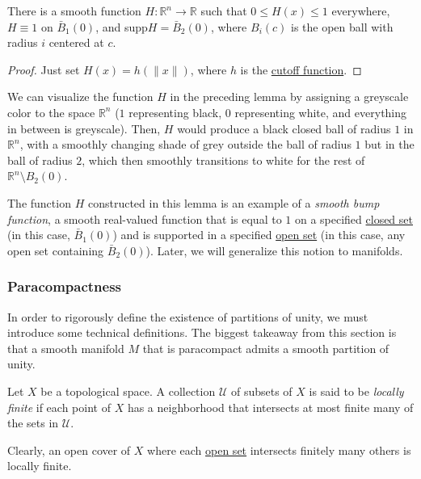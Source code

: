 \documentclass{article}
\newcounter{definition}[section]
\newcounter{example}[section]
\begin{document}
    \begin{lemma}
      \label{thm:smooth-bump-function-on-rn}
      There is a smooth function $H: \mathbb{R}^n \to \mathbb{R}$ such that $0 \leq H(x) \leq 1$ everywhere, $H \equiv 1$ on $\bar{B}_1 (0)$, and supp$H = \bar{B}_2 (0)$, where $B_i (c)$ is the open ball with radius $i$ centered at $c$. 
    \end{lemma}
    \begin{proof}
      Just set $H(x) = h(\|x\|)$,  where $h$ is the \hyperref[thm:cutoff-function]{cutoff function}. 
    \end{proof}

    We can visualize the function $H$ in the preceding lemma by assigning a greyscale color to the space $\mathbb{R}^n$ ($1$ representing black, $0$ representing white, and everything in between is greyscale). Then, $H$ would produce a black closed ball of radius $1$ in $\mathbb{R}^n$, with a smoothly changing shade of grey outside the ball of radius $1$ but in the ball of radius $2$, which then smoothly transitions to white for the rest of $\mathbb{R}^n \setminus B_2 (0)$. 

    The function $H$ constructed in this lemma is an example of a \textit{smooth bump function}, a smooth real-valued function that is equal to $1$ on a specified \hyperref[pst-def:closed]{closed set} (in this case, $\bar{B}_1 (0)$) and is supported in a specified \hyperref[pst-def:open-set]{open set} (in this case, any open set containing $\bar{B}_2 (0)$). Later, we will generalize this notion to manifolds. 

    \subsubsection{Paracompactness}

      In order to rigorously define the existence of partitions of unity, we must introduce some technical definitions. The biggest takeaway from this section is that a smooth manifold $M$ that is paracompact admits a smooth partition of unity. 

      \begin{definition}
        \label{def:locally-finite}
        Let $X$ be a topological space. A collection $\mathcal{U}$ of subsets of $X$ is said to be \textit{locally finite} if each point of $X$ has a neighborhood that intersects at most finite many of the sets in $\mathcal{U}$. 

        Clearly, an open cover of $X$ where each \hyperref[pst-def:open-set]{open set} intersects finitely many others is locally finite.
      \end{definition}
\end{document}
